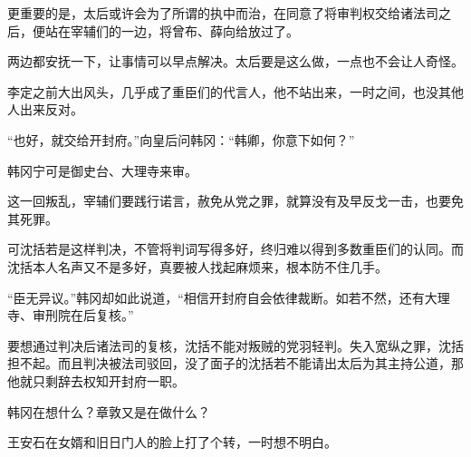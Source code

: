 更重要的是，太后或许会为了所谓的执中而治，在同意了将审判权交给诸法司之后，便站在宰辅们的一边，将曾布、薛向给放过了。

两边都安抚一下，让事情可以早点解决。太后要是这么做，一点也不会让人奇怪。

李定之前大出风头，几乎成了重臣们的代言人，他不站出来，一时之间，也没其他人出来反对。

“也好，就交给开封府。”向皇后问韩冈：“韩卿，你意下如何？”

韩冈宁可是御史台、大理寺来审。

这一回叛乱，宰辅们要践行诺言，赦免从党之罪，就算没有及早反戈一击，也要免其死罪。

可沈括若是这样判决，不管将判词写得多好，终归难以得到多数重臣们的认同。而沈括本人名声又不是多好，真要被人找起麻烦来，根本防不住几手。

“臣无异议。”韩冈却如此说道，“相信开封府自会依律裁断。如若不然，还有大理寺、审刑院在后复核。”

要想通过判决后诸法司的复核，沈括不能对叛贼的党羽轻判。失入宽纵之罪，沈括担不起。而且判决被法司驳回，没了面子的沈括若不能请出太后为其主持公道，那他就只剩辞去权知开封府一职。

韩冈在想什么？章敦又是在做什么？

王安石在女婿和旧日门人的脸上打了个转，一时想不明白。

